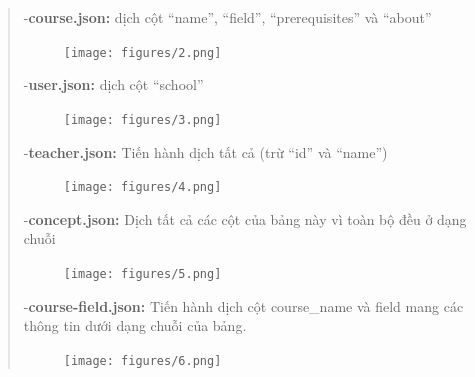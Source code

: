 \begin{quote}
-\textbf{course.json:} dịch cột “name”, “field”, “prerequisites” và “about”\\
\begin{figure}[H]
    \centering
    \texttt{[image: figures/2.png]}
\end{figure}
-\textbf{user.json:} dịch cột “school”
\begin{figure}[H]
    \centering
    \texttt{[image: figures/3.png]}
\end{figure}
\newpage
-\textbf{teacher.json:} Tiến hành dịch tất cả (trừ “id” và “name”)\\
\begin{figure}[H]
    \centering
    \texttt{[image: figures/4.png]}
\end{figure}
-\textbf{concept.json:} Dịch tất cả các cột của bảng này vì toàn bộ đều ở dạng chuỗi
\begin{figure}[H]
    \centering
    \texttt{[image: figures/5.png]}
\end{figure}
-\textbf{course-field.json:} Tiến hành dịch cột course\_name và field mang các thông tin dưới dạng chuỗi của bảng.
\begin{figure}[H]
    \centering
    \texttt{[image: figures/6.png]}
\end{figure}
\end{quote}
